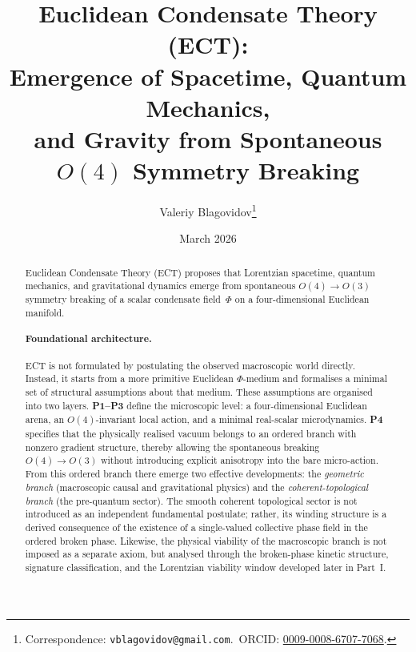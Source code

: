\documentclass[11pt,a4paper]{article}
\title{Euclidean Condensate Theory (ECT):\\
Emergence of Spacetime, Quantum Mechanics,\\
and Gravity from Spontaneous $O(4)$ Symmetry Breaking}
\author{Valeriy Blagovidov\thanks{Correspondence: \texttt{vblagovidov@gmail.com}.~ORCID: \href{https://orcid.org/0009-0008-6707-7068}{0009-0008-6707-7068}.}}
\date{March 2026}
\numberwithin{equation}{section}
\begin{document}
\maketitle


\begin{abstract}
Euclidean Condensate Theory (ECT) proposes that Lorentzian spacetime,
quantum mechanics, and gravitational dynamics emerge from spontaneous
$O(4)\to O(3)$ symmetry breaking of a scalar condensate field~$\Phi$
on a four-dimensional Euclidean manifold.

\paragraph{Foundational architecture.}
ECT is not formulated by postulating the observed macroscopic world
directly. Instead, it starts from a more primitive Euclidean
$\Phi$-medium and formalises a minimal set of structural assumptions
about that medium. These assumptions are organised into two layers.
\textbf{P1--P3} define the microscopic level: a four-dimensional
Euclidean arena, an $O(4)$-invariant local action, and a minimal
real-scalar microdynamics.
\textbf{P4} specifies that the physically realised vacuum belongs to
an ordered branch with nonzero gradient structure, thereby allowing the
spontaneous breaking $O(4)\to O(3)$ without introducing explicit
anisotropy into the bare micro-action.
From this ordered branch there emerge two effective developments:
the \emph{geometric branch} (macroscopic causal and gravitational
physics) and the \emph{coherent-topological branch} (the pre-quantum
sector). The smooth coherent topological sector is not introduced as an
independent fundamental postulate; rather, its winding structure is a
derived consequence of the existence of a single-valued collective phase
field in the ordered broken phase. Likewise, the physical viability of
the macroscopic branch is not imposed as a separate axiom, but analysed
through the broken-phase kinetic structure, signature classification,
and the Lorentzian viability window developed later in Part~I.


\end{abstract}
\end{document}
